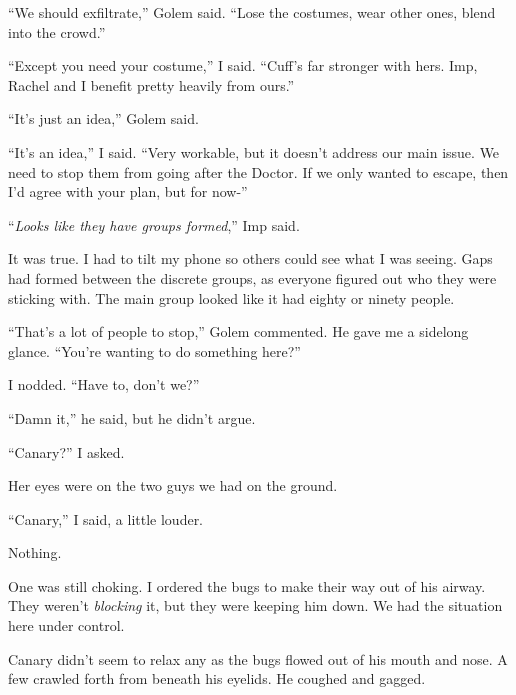 ``We should exfiltrate,'' Golem said.  ``Lose the costumes, wear other ones, blend into the crowd.''



``Except you need your costume,'' I said.  ``Cuff's far stronger with hers.  Imp, Rachel and I benefit pretty heavily from ours.''



``It's just an idea,'' Golem said.



``It's an idea,'' I said.  ``Very workable, but it doesn't address our main issue.  We need to stop them from going after the Doctor.  If we only wanted to escape, then I'd agree with your plan, but for now-''



``\emph{Looks like they have groups formed},'' Imp said.



It was true.  I had to tilt my phone so others could see what I was seeing.  Gaps had formed between the discrete groups, as everyone figured out who they were sticking with.  The main group looked like it had eighty or ninety people.



``That's a lot of people to stop,'' Golem commented.  He gave me a sidelong glance.  ``You're wanting to do something here?''



I nodded.  ``Have to, don't we?''



``Damn it,'' he said, but he didn't argue.



``Canary?'' I asked.



Her eyes were on the two guys we had on the ground.



``Canary,'' I said, a little louder.



Nothing.



One was still choking.  I ordered the bugs to make their way out of his airway.  They weren't \emph{blocking} it, but they were keeping him down.  We had the situation here under control.



Canary didn't seem to relax any as the bugs flowed out of his mouth and nose.  A few crawled forth from beneath his eyelids.  He coughed and gagged.



